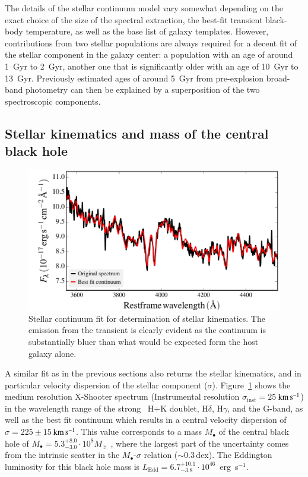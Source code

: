 \documentclass[traditabstract]{aa}
\newcommand{\kms}{$\rm{km\,s^{-1}}$}
\newcommand{\hg}{H$\gamma$}
\newcommand{\hd}{H$\delta$}
\begin{document}
The details of the stellar continuum model vary somewhat depending on the exact choice of the size of the spectral extraction, the best-fit transient black-body temperature, as well as the base list of galaxy templates. However, contributions from two stellar populations are always required for a decent fit of the stellar component in the galaxy center: a population with an age of around 1~Gyr to 2~Gyr, another one that is significantly older with an age of 10~Gyr to 13~Gyr. Previously estimated ages of around 5~Gyr from pre-explosion broad-band photometry \citep{2015ATel.7843....1M, 2016NatAs...1E...2L,  2016Sci...351..257D} can then be explained by a superposition of the two spectroscopic components. 

\subsection{Stellar kinematics and mass of the central black hole}

\begin{figure}
  \includegraphics[width=0.999\linewidth]{fig/XS_stargas.pdf}
\caption{Stellar continuum fit for determination of stellar kinematics. The emission from the transient is clearly evident as the continuum is substantially bluer than what would be expected form the host galaxy alone.}
\label{fig:stargas_sig}
\end{figure}

A similar fit as in the previous sections also returns the stellar kinematics, and in particular velocity dispersion of the stellar component ($\sigma$). Figure~\ref{fig:stargas_sig} shows the medium resolution X-Shooter spectrum (Instrumental resolution $\sigma_{\mathrm{inst}}=25$\,\kms) in the wavelength range of the strong ~H+K doublet, \hd, \hg, and the G-band, as well as the best fit continuum which results in a central velocity dispersion of $\sigma=225\pm15$\,\kms. This value corresponds to a mass $M_\bullet$ of the central black hole of $M_\bullet = 5.3_{-3.0}^{+8.0}\cdot10^{8} M_\sun$ \citep[Eq. 3, 5 or 7 in][]{2013ARA&A..51..511K}, where the largest part of the uncertainty comes from the intrinsic scatter in the $M_\bullet$-$\sigma$ relation ($\sim0.3$\,dex). The Eddington luminosity for this black hole mass is $L_{\mathrm{Edd}}=6.7_{-3.8}^{+10.1}\cdot10^{46}$~erg~s$^{-1}$.
\end{document}
